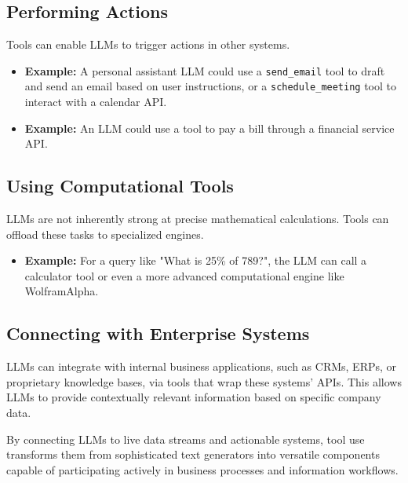 \subsection*{Performing Actions}
Tools can enable LLMs to trigger actions in other systems.
\begin{itemize}
    \item \textbf{Example:} A personal assistant LLM could use a \texttt{send\_email} tool to draft and send an email based on user instructions, or a 
    \texttt{schedule\_meeting} tool to interact with a calendar API.
    \item \textbf{Example:} An LLM could use a tool to pay a bill through a financial service API.
\end{itemize}

\subsection*{Using Computational Tools}
LLMs are not inherently strong at precise mathematical calculations. Tools can offload these tasks to specialized engines.
\begin{itemize}
    \item \textbf{Example:} For a query like "What is 25\% of 789?", the LLM can call a calculator tool or even a more advanced computational engine like WolframAlpha.
\end{itemize}

\subsection*{Connecting with Enterprise Systems}
LLMs can integrate with internal business applications, such as CRMs, ERPs, or proprietary knowledge bases, via tools that wrap these systems' APIs. 
This allows LLMs to provide contextually relevant information based on specific company data.

By connecting LLMs to live data streams and actionable systems, tool use transforms them from sophisticated text generators into versatile components 
capable of participating actively in business processes and information workflows. 